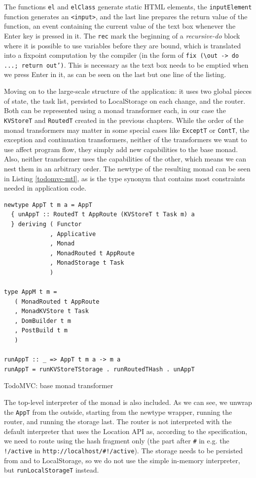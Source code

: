 \documentclass[english,zadani,odsaz]{fitthesis}
\begin{document}
The functions \texttt{el} and \texttt{elClass} generate static HTML elements, the
\texttt{inputElement} function generates an \texttt{<input>}, and the last line prepares the
return value of the function, an event containing the current value of the text
box whenever the Enter key is pressed in it. The \texttt{rec} mark the beginning of a
\emph{recursive-do} block where it is possible to use variables before they are bound,
which is translated into a fixpoint computation by the compiler (in the form of
\texttt{fix (\textbackslash{}out -> do ...; return out')}. This is necessary as the text box needs to be
emptied when we press Enter in it, as can be seen on the last but one line of
the listing.

Moving on to the large-scale structure of the application: it uses two global
pieces of state, the task list, persisted to LocalStorage on each change, and
the router. Both can be represented using a monad transformer each, in our case
the \texttt{KVStoreT} and \texttt{RoutedT} created in the previous chapters. While the order of
the monad transformers may matter in some special cases like \texttt{ExceptT} or \texttt{ContT},
the exception and continuation transformers, neither of the transformers we want
to use affect program flow, they simply add new capabilities to the base
monad. Also, neither transformer uses the capabilities of the other, which means
we can nest them in an arbitrary order. The newtype of the resulting monad can
be seen in Listing \ref{todomvc-mtl}, as is the type synonym that contains most
constraints needed in application code.

\begin{listing}[!b]
\begin{verbatim}
newtype AppT t m a = AppT
  { unAppT :: RoutedT t AppRoute (KVStoreT t Task m) a
  } deriving ( Functor
             , Applicative
             , Monad
             , MonadRouted t AppRoute
             , MonadStorage t Task
             )

type AppM t m =
   ( MonadRouted t AppRoute
   , MonadKVStore t Task
   , DomBuilder t m
   , PostBuild t m
   )

runAppT :: _ => AppT t m a -> m a
runAppT = runKVStoreTStorage . runRoutedTHash . unAppT
\end{verbatim}
\caption{TodoMVC: base monad transformer \label{todomvc-mtl}}
\end{listing}

The top-level interpreter of the monad is also included. As we can see, we
unwrap the \texttt{AppT} from the outside, starting from the newtype wrapper, running the
router, and running the storage last. The router is not interpreted with the
default interpreter that uses the Location API as, according to the
specification, we need to route using the hash fragment only (the part after \texttt{\#}
in e.g. the \texttt{!/active} in \texttt{http://localhost/\#!/active}). The storage needs to be persisted
from and to LocalStorage, so we do not use the simple in-memory interpreter, but
\texttt{runLocalStorageT} instead.
\end{document}
